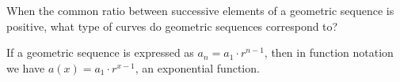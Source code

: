 \documentclass{ximera}
\begin{document}
\begin{question}
  When the common ratio between successive elements of a geometric sequence is positive, what
  type of curves do geometric sequences correspond to?
  \begin{multipleChoice}
  \end{multipleChoice}
  \begin{feedback}
  If a geometric sequence is expressed as $a_n = a_1 \cdot r^{n-1}$,
  then in function notation we have $a(x) = a_1 \cdot r^{x-1}$, an
  exponential function.
  \end{feedback}
\end{question}
\end{document}
